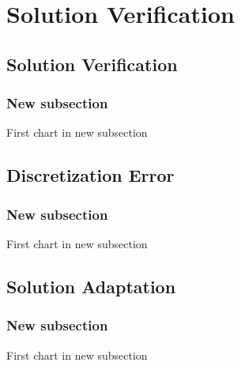 % 

\section{Solution Verification}

\subsection{Solution Verification}
\begin{frame}\frametitle{New subsection}
	First chart in new subsection
\end{frame}

\subsection{Discretization Error}
\begin{frame}\frametitle{New subsection}
	First chart in new subsection
\end{frame}

\subsection{Solution Adaptation}
\begin{frame}\frametitle{New subsection}
	First chart in new subsection
\end{frame}


\endinput  %
